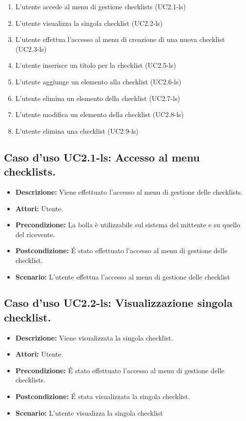 \begin{itemize}
\begin{enumerate}
\item L'utente accede al menu di gestione checklists (UC2.1-ls)
\item L'utente visualizza la singola checklist (UC2.2-ls)
\item L'utente effettua l'accesso al menu di creazione di una nuova checklist (UC2.3-ls)
\item L'utente inserisce un titolo per la checklist (UC2.5-ls)
\item L'utente aggiunge un elemento alla checklist (UC2.6-ls)
\item L'utente elimina un elemento della checklist (UC2.7-ls)
\item L'utente modifica un elemento della checklist (UC2.8-ls)
\item L'utente elimina una checklist (UC2.9-ls)

\end{enumerate} 
\end{itemize}

\subsection{Caso d'uso UC2.1-ls: Accesso al menu checklists.}
\begin{itemize}
\item[]\textbf{Descrizione:} Viene effettuato l'accesso al menu di gestione delle checklists.
\item[]\textbf{Attori:} Utente. 
\item[]\textbf{Precondizione:} La bolla è utilizzabile sul sistema del mittente e su quello del ricevente. 
\item[]\textbf{Postcondizione:} \'E stato effettuato l'accesso al menu di gestione delle checklist. 
\item[]\textbf{Scenario:}
L'utente effettua l'accesso al menu di gestione delle checklist 
\end{itemize}

\subsection{Caso d'uso UC2.2-ls: Visualizzazione singola checklist.}
\begin{itemize}
\item[]\textbf{Descrizione:} Viene visualizzata la singola checklist.
\item[]\textbf{Attori:} Utente. 
\item[]\textbf{Precondizione:} \'E stato effettuato l'accesso al menu di gestione delle checklists. 
\item[]\textbf{Postcondizione:} \'E stata visualizzata la singola checklist. 
\item[]\textbf{Scenario:}
L'utente visualizza la singola checklist 
\end{itemize}

